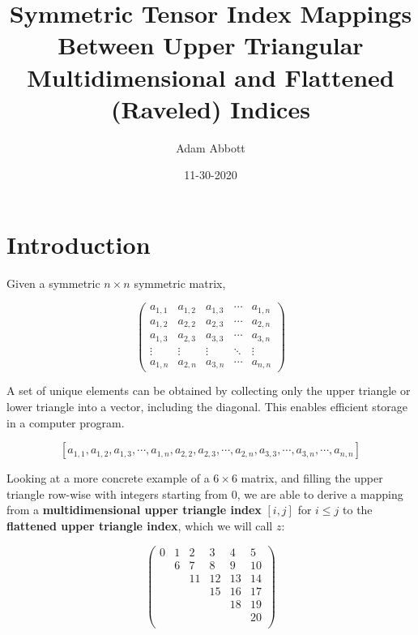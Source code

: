 \documentclass{article}
\title{Symmetric Tensor Index Mappings Between Upper Triangular Multidimensional and Flattened (Raveled) Indices}
\date{11-30-2020}
\author{Adam Abbott}
\begin{document}
\maketitle

\section{Introduction}
Given a symmetric $n \times n$ symmetric matrix,

\begin{equation*}
\begin{pmatrix}
a_{1,1} & a_{1,2} & a_{1,3} & \cdots & a_{1,n} \\
a_{1,2} & a_{2,2} & a_{2,3} & \cdots & a_{2,n} \\
a_{1,3} & a_{2,3} & a_{3,3} & \cdots & a_{3,n} \\
\vdots  & \vdots  & \vdots  & \ddots & \vdots  \\
a_{1,n} & a_{2,n}& a_{3,n}  & \cdots & a_{n,n} 
\end{pmatrix}
\end{equation*}

A set of unique elements can be obtained by collecting only the upper triangle or lower triangle into a vector, including the diagonal. 
This enables efficient storage in a computer program.

\begin{equation*}
\left[ a_{1,1}, a_{1,2}, a_{1,3} , \cdots , a_{1,n} , a_{2,2} , a_{2,3} , \cdots , a_{2,n} , a_{3,3} , \cdots , a_{3,n} , \cdots , a_{n,n} \right]
\end{equation*}

Looking at a more concrete example of a $6 \times 6$ matrix, and filling the upper triangle row-wise with integers starting from 0, we are able to derive 
a mapping from a \textbf{multidimensional upper triangle index}  $[i,j]$ for $i \leq j$ to the \textbf{flattened upper triangle index}, which we will call $z$:

\begin{equation*}
\begin{pmatrix}
0 & 1 & 2 & 3 & 4 & 5 \\
  & 6 & 7 & 8 & 9 & 10 \\
  &   & 11 & 12 & 13 & 14 \\
  &   &    & 15 & 16 & 17 \\
  &   &    &    & 18 & 19 \\
  &   &    &    &    & 20 \\
\end{pmatrix}
\end{equation*}
\end{document}
